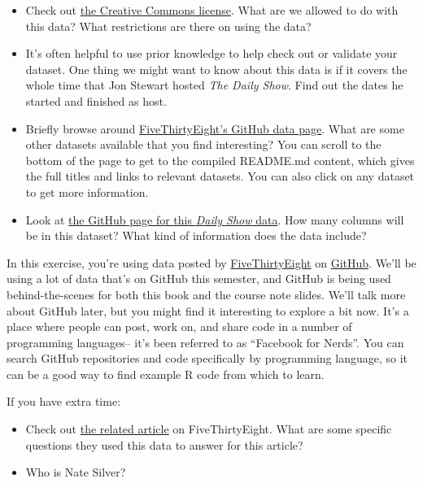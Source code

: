 \documentclass[]{book}
\makeatletter
\providecommand{\tightlist}{%
  \setlength{\itemsep}{0pt}\setlength{\parskip}{0pt}}
\newenvironment{kframe}{%
\medskip{}
\setlength{\fboxsep}{.8em}
 \def\at@end@of@kframe{}%
 \ifinner\ifhmode%
  \def\at@end@of@kframe{\end{minipage}}%
  \begin{minipage}{\columnwidth}%
 \fi\fi%
 \def\FrameCommand##1{\hskip\@totalleftmargin \hskip-\fboxsep
 \colorbox{shadecolor}{##1}\hskip-\fboxsep
     \hskip-\linewidth \hskip-\@totalleftmargin \hskip\columnwidth}%
 \MakeFramed {\advance\hsize-\width
   \@totalleftmargin\z@ \linewidth\hsize
   \@setminipage}}%
 {\par\unskip\endMakeFramed%
 \at@end@of@kframe}
\newenvironment{rmdblock}[1]
  {
  \begin{itemize}
  \renewcommand{\labelitemi}{
    \raisebox{-.7\height}[0pt][0pt]{
      {\setkeys{Gin}{width=3em,keepaspectratio}\texttt{[image: images/\#1]}}
    }
  }
  \setlength{\fboxsep}{1em}
  \begin{kframe}
  \item
  }
  {
  \end{kframe}
  \end{itemize}
  }
\newenvironment{rmdnote}
  {\begin{rmdblock}{note}}
  {\end{rmdblock}}
\makeatother
\begin{document}
\begin{itemize}
\tightlist
\item
  Check out \href{http://creativecommons.org/licenses/by/4.0/}{the
  Creative Commons license}. What are we allowed to do with this data?
  What restrictions are there on using the data?
\item
  It's often helpful to use prior knowledge to help check out or
  validate your dataset. One thing we might want to know about this data
  is if it covers the whole time that Jon Stewart hosted \emph{The Daily
  Show}. Find out the dates he started and finished as host.
\item
  Briefly browse around
  \href{https://github.com/fivethirtyeight/data}{FiveThirtyEight's
  GitHub data page}. What are some other datasets available that you
  find interesting? You can scroll to the bottom of the page to get to
  the compiled README.md content, which gives the full titles and links
  to relevant datasets. You can also click on any dataset to get more
  information.
\item
  Look at
  \href{https://github.com/fivethirtyeight/data/tree/master/daily-show-guests}{the
  GitHub page for this \emph{Daily Show} data}. How many columns will be
  in this dataset? What kind of information does the data include?
\end{itemize}

\begin{rmdnote}
In this exercise, you're using data posted by
\href{http://fivethirtyeight.com}{FiveThirtyEight} on
\href{https://github.com}{GitHub}. We'll be using a lot of data that's
on GitHub this semester, and GitHub is being used behind-the-scenes for
both this book and the course note slides. We'll talk more about GitHub
later, but you might find it interesting to explore a bit now. It's a
place where people can post, work on, and share code in a number of
programming languages-- it's been referred to as ``Facebook for Nerds''.
You can search GitHub repositories and code specifically by programming
language, so it can be a good way to find example R code from which to
learn.
\end{rmdnote}

If you have extra time:

\begin{itemize}
\tightlist
\item
  Check out
  \href{http://fivethirtyeight.com/datalab/every-guest-jon-stewart-ever-had-on-the-daily-show/}{the
  related article} on FiveThirtyEight. What are some specific questions
  they used this data to answer for this article?
\item
  Who is Nate Silver?
\end{itemize}
\end{document}
